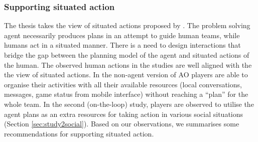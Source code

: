 \subsubsection{Supporting situated action}\label{sec:conclusionSituatedAction}
The thesis takes the view of situated actions proposed by \cite{Suchman1987}. The problem solving agent necessarily produces plans in an attempt to guide human teams, while humans act in a situated manner. There is a need to design interactions that bridge the gap between the planning model of the agent and situated actions of the human. The observed human actions in the studies are well aligned with the the view of situated actions. In the non-agent version of \ac{AO} players are able to organise their activities with all their available resources (local conversations, messages, game status from mobile interface) without reaching a ``plan'' for the whole team.  In the second (on-the-loop) study, players are observed to utilise the agent plans as an extra resources for taking action in various social situations (Section \ref{sec:study2social}). Based on our observations, we summarises some recommendations for supporting situated action. \\

